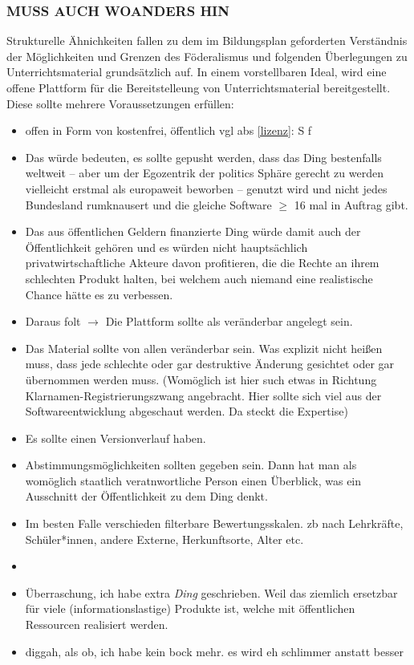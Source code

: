 \subsubsection{MUSS AUCH WOANDERS HIN}
Strukturelle Ähnichkeiten fallen zu dem im Bildungsplan geforderten Verständnis der Möglichkeiten und Grenzen des Föderalismus und folgenden Überlegungen zu Unterrichtsmaterial grundsätzlich auf.
In einem vorstellbaren Ideal, wird eine offene Plattform für die Bereitstelleung von Unterrichtsmaterial bereitgestellt.
Diese sollte mehrere Voraussetzungen erfüllen:
\begin{itemize}
    \item offen in Form von kostenfrei, öffentlich \gls{vgl} \gls{abs} \ref{lizenz}: \gls{S} \pageref{lizenz}f
    \item Das würde bedeuten, es sollte gepusht werden, dass das Ding bestenfalls weltweit -- aber um der Egozentrik der politics Sphäre gerecht zu werden vielleicht erstmal als europaweit beworben -- genutzt wird und nicht jedes Bundesland rumknausert und die gleiche Software $\geq$ 16 mal in Auftrag gibt.
    \item Das aus öffentlichen Geldern finanzierte Ding würde damit auch der Öffentlichkeit gehören und es würden nicht hauptsächlich privatwirtschaftliche Akteure davon profitieren, die die Rechte an ihrem schlechten Produkt halten, bei welchem auch niemand eine realistische Chance hätte es zu verbessen.
    \item Daraus folt $\rightarrow$ Die Plattform sollte als veränderbar angelegt sein.
    \item Das Material sollte von allen veränderbar sein. Was explizit nicht heißen muss, dass jede schlechte oder gar destruktive Änderung gesichtet oder gar übernommen werden muss.
    (Womöglich ist hier such etwas in Richtung Klarnamen-Registrierungszwang angebracht. Hier sollte sich viel aus der Softwareentwicklung abgeschaut werden. Da steckt die Expertise)
    \item Es sollte einen Versionverlauf haben.
    \item Abstimmungsmöglichkeiten sollten gegeben sein. Dann hat man als womöglich staatlich veratnwortliche Person einen Überblick, was ein Ausschnitt der Öffentlichkeit zu dem Ding denkt.
    \item Im besten Falle verschieden filterbare Bewertungsskalen. \Gls{zb} nach Lehrkräfte, Schüler*innen, andere Externe, Herkunftsorte, Alter etc.
    \item 
    \item Überraschung, ich habe extra \emph{Ding} geschrieben. Weil das ziemlich ersetzbar für viele (informationslastige) Produkte ist, welche mit öffentlichen Ressourcen realisiert werden.
    \item diggah, als ob, ich habe kein bock mehr. es wird eh schlimmer anstatt besser
\end{itemize}


